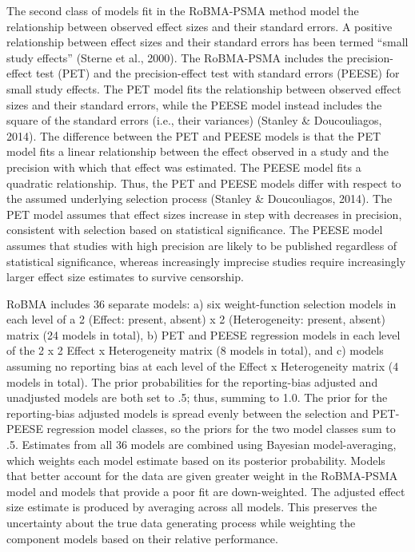 \documentclass[
  man, donotrepeattitle,floatsintext]{apa7}
\begin{document}
The second class of models fit in the RoBMA-PSMA method model the relationship between observed effect sizes and their standard errors. A positive relationship between effect sizes and their standard errors has been termed ``small study effects'' (Sterne et al., 2000). The RoBMA-PSMA includes the precision-effect test (PET) and the precision-effect test with standard errors (PEESE) for small study effects. The PET model fits the relationship between observed effect sizes and their standard errors, while the PEESE model instead includes the square of the standard errors (i.e., their variances) (Stanley \& Doucouliagos, 2014). The difference between the PET and PEESE models is that the PET model fits a linear relationship between the effect observed in a study and the precision with which that effect was estimated. The PEESE model fits a quadratic relationship. Thus, the PET and PEESE models differ with respect to the assumed underlying selection process (Stanley \& Doucouliagos, 2014). The PET model assumes that effect sizes increase in step with decreases in precision, consistent with selection based on statistical significance. The PEESE model assumes that studies with high precision are likely to be published regardless of statistical significance, whereas increasingly imprecise studies require increasingly larger effect size estimates to survive censorship.

RoBMA includes 36 separate models: a) six weight-function selection models in each level of a 2 (Effect: present, absent) x 2 (Heterogeneity: present, absent) matrix (24 models in total), b) PET and PEESE regression models in each level of the 2 x 2 Effect x Heterogeneity matrix (8 models in total), and c) models assuming no reporting bias at each level of the Effect x Heterogeneity matrix (4 models in total). The prior probabilities for the reporting-bias adjusted and unadjusted models are both set to .5; thus, summing to 1.0. The prior for the reporting-bias adjusted models is spread evenly between the selection and PET-PEESE regression model classes, so the priors for the two model classes sum to .5. Estimates from all 36 models are combined using Bayesian model-averaging, which weights each model estimate based on its posterior probability. Models that better account for the data are given greater weight in the RoBMA-PSMA model and models that provide a poor fit are down-weighted. The adjusted effect size estimate is produced by averaging across all models. This preserves the uncertainty about the true data generating process while weighting the component models based on their relative performance.
\end{document}
